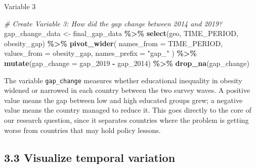 \documentclass[
]{article}
\newenvironment{Shaded}{\begin{snugshade}}{\end{snugshade}}
\newcommand{\AttributeTok}[1]{\textcolor[rgb]{0.13,0.29,0.53}{#1}}
\newcommand{\CommentTok}[1]{\textcolor[rgb]{0.56,0.35,0.01}{\textit{#1}}}
\newcommand{\FunctionTok}[1]{\textcolor[rgb]{0.13,0.29,0.53}{\textbf{#1}}}
\newcommand{\NormalTok}[1]{#1}
\newcommand{\OtherTok}[1]{\textcolor[rgb]{0.56,0.35,0.01}{#1}}
\newcommand{\SpecialCharTok}[1]{\textcolor[rgb]{0.81,0.36,0.00}{\textbf{#1}}}
\newcommand{\StringTok}[1]{\textcolor[rgb]{0.31,0.60,0.02}{#1}}
\begin{document}
Variable 3

\begin{Shaded}
\begin{Highlighting}[]
\CommentTok{\# Create Variable 3: How did the gap change between 2014 and 2019?}
\NormalTok{gap\_change\_data }\OtherTok{\textless{}{-}}\NormalTok{ final\_gap\_data }\SpecialCharTok{\%\textgreater{}\%}
  \FunctionTok{select}\NormalTok{(geo, TIME\_PERIOD, obesity\_gap) }\SpecialCharTok{\%\textgreater{}\%}
  \FunctionTok{pivot\_wider}\NormalTok{(}
    \AttributeTok{names\_from =}\NormalTok{ TIME\_PERIOD,}
    \AttributeTok{values\_from =}\NormalTok{ obesity\_gap,}
    \AttributeTok{names\_prefix =} \StringTok{"gap\_"}
\NormalTok{  ) }\SpecialCharTok{\%\textgreater{}\%}
  \FunctionTok{mutate}\NormalTok{(}\AttributeTok{gap\_change =}\NormalTok{ gap\_2019 }\SpecialCharTok{{-}}\NormalTok{ gap\_2014) }\SpecialCharTok{\%\textgreater{}\%}
  \FunctionTok{drop\_na}\NormalTok{(gap\_change)}
\end{Highlighting}
\end{Shaded}

The variable \texttt{gap\_change} measures whether educational
inequality in obesity widened or narrowed in each country between the
two survey waves. A positive value means the gap between low and high
educated groups grew; a negative value means the country managed to
reduce it. This goes directly to the core of our research question,
since it separates countries where the problem is getting worse from
countries that may hold policy lessons.

\subsection{3.3 Visualize temporal
variation}\label{visualize-temporal-variation}
\end{document}
